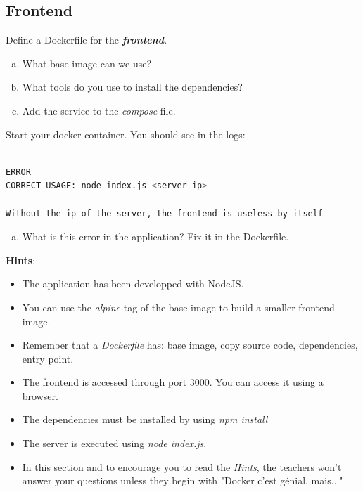 \documentclass[a4paper,11pt]{exam}
\begin{document}
\subsection{Frontend}
\begin{questions}
	\question Define a Dockerfile for the \textit{\textbf{frontend}}.
	\begin{enumerate}[(a)]
		\item What base image can we use?
		\item What tools do you use to install the dependencies?
		\item Add the service to the \textit{compose} file.
	\end{enumerate}
Start your docker container. You should see in the logs: 
\begin{lstlisting}[frame=single,language={sh}]  % Start your code-block

ERROR
CORRECT USAGE: node index.js <server_ip>

Without the ip of the server, the frontend is useless by itself	
\end{lstlisting}
\begin{enumerate}[(d)]
		\item What is this error in the application? Fix it in the Dockerfile.
\end{enumerate}
	
	\textbf{Hints}:
	\begin{itemize}
		\item The application has been developped with NodeJS.
		\item You can use the \textit{alpine} tag of the base image to build a smaller frontend image.
		\item Remember that a \textit{Dockerfile} has: base image, copy source code, dependencies, entry point.
		\item The frontend is accessed through port 3000. You can access it using a browser.
		\item The dependencies must be installed by using \textit{npm install} 
		\item The server is executed using \textit{node index.js}.
		\item In this section and to encourage you to read the \textit{Hints}, the teachers won't answer your questions unless they begin with "Docker c'est génial, mais..."
	\end{itemize}
	\end{questions}
\end{document}

